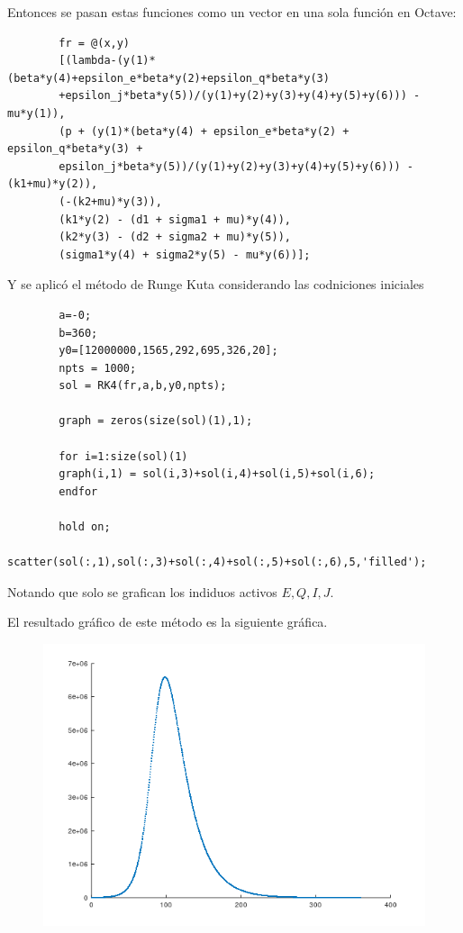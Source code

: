 \documentclass[a4paper, 12pt]{article}
\begin{document}
    Entonces se pasan estas funciones como un vector en una sola función en Octave:

    \begin{verbatim}
        fr = @(x,y)
        [(lambda-(y(1)*(beta*y(4)+epsilon_e*beta*y(2)+epsilon_q*beta*y(3)
        +epsilon_j*beta*y(5))/(y(1)+y(2)+y(3)+y(4)+y(5)+y(6))) - mu*y(1)),
        (p + (y(1)*(beta*y(4) + epsilon_e*beta*y(2) + epsilon_q*beta*y(3) +
        epsilon_j*beta*y(5))/(y(1)+y(2)+y(3)+y(4)+y(5)+y(6))) - (k1+mu)*y(2)),
        (-(k2+mu)*y(3)),
        (k1*y(2) - (d1 + sigma1 + mu)*y(4)),
        (k2*y(3) - (d2 + sigma2 + mu)*y(5)),
        (sigma1*y(4) + sigma2*y(5) - mu*y(6))];
    \end{verbatim}

    Y se aplicó el método de Runge Kuta considerando las codniciones iniciales

    \begin{verbatim}
        a=-0;
        b=360;
        y0=[12000000,1565,292,695,326,20];
        npts = 1000;
        sol = RK4(fr,a,b,y0,npts);

        graph = zeros(size(sol)(1),1);

        for i=1:size(sol)(1)
        graph(i,1) = sol(i,3)+sol(i,4)+sol(i,5)+sol(i,6);
        endfor

        hold on;
        scatter(sol(:,1),sol(:,3)+sol(:,4)+sol(:,5)+sol(:,6),5,'filled');
    \end{verbatim}

    Notando que solo se grafican los indiduos activos $E, Q, I, J$.
    
    El resultado gráfico de este método es la siguiente gráfica.

    \begin{figure}[ht!]
        \centering
        \includegraphics[width=16cm]{img/e3.png}
    \end{figure}
\end{document}
